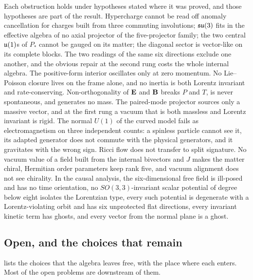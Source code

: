 Each obstruction holds under hypotheses stated where it was proved, and those hypotheses are part of the result. Hypercharge cannot be read off anomaly cancellation for
charges built from three commuting involutions; $\mathfrak{su}(3)$ fits in the effective algebra of no axial projector of the five-projector family; the two central $\mathfrak{u}(1)$s of $P_*$
cannot be gauged on its matter; the diagonal sector is vector-like on its complete blocks. The two readings of the same six directions exclude one another, and the
obvious repair at the second rung costs the whole internal algebra. The positive-form interior oscillates only at zero momentum. No Lie--Poisson closure lives on the frame
alone, and no inertia is both Lorentz invariant and rate-conserving. Non-orthogonality of $\mathbf E$ and $\mathbf B$ breaks $P$ and $T$, is never spontaneous, and generates no mass.
The paired-mode projector sources only a massive vector, and at the first rung a vacuum that is both massless and Lorentz invariant is rigid. The normal $U(1)$ of the curved
model fails as electromagnetism on three independent counts: a spinless particle cannot see it, its adapted generator does not commute with the physical generators, and it
gravitates with the wrong sign. Ricci flow does not transfer to split signature. No vacuum value of a field built from the internal bivectors and $J$ makes the matter
chiral, Hermitian order parameters keep rank five, and vacuum alignment does not see chirality. In the causal analysis, the six-dimensional free field is ill-posed and has
no time orientation, no $SO(3,3)$-invariant scalar potential of degree below eight isolates the Lorentzian type, every such potential is degenerate with a Lorentz-violating
orbit and has six unprotected flat directions, every invariant kinetic term has ghosts, and every vector from the normal plane is a ghost.

\subsection{Open, and the choices that remain}

 lists the choices that the algebra leaves free, with the place where each enters. Most of the open problems are downstream of them.

